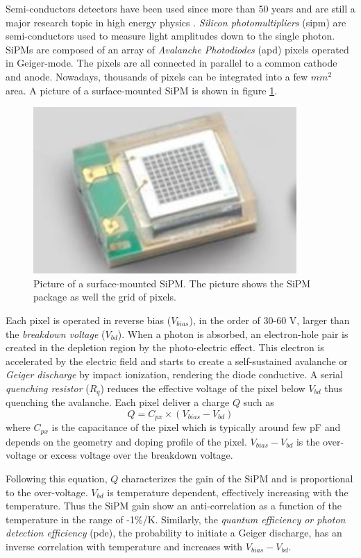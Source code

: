 Semi-conductors detectors have been used since more than 50 years and are still a major research topic in high energy physics \cite{1748-0221-4-04-P04004, Garutti:2011qv, Garutti:2017ipx}. \textit{Silicon photomultipliers} (\acrshort{sipm}) are semi-conductors used to measure light amplitudes down to the single photon. SiPMs are composed of an array of \textit{Avalanche Photodiodes} (\acrshort{apd}) pixels operated in Geiger-mode. The pixels are all connected in parallel to a common cathode and anode. Nowadays, thousands of pixels can be integrated into a few $mm^2$ area. A picture of a surface-mounted SiPM is shown in figure \ref{fig:SMD_SiPM}.

\begin{figure}[htbp!]
  \centering
  \includegraphics[width=0.4\linewidth]{chap3/fig/SMD_SiPM.png}
  \caption{Picture of a surface-mounted SiPM. The picture shows the SiPM package as well the grid of pixels.} \label{fig:SMD_SiPM}
\end{figure}

Each pixel is operated in reverse bias ($V_{bias}$), in the order of 30-60 V, larger than the \textit{breakdown voltage} ($V_{bd}$). When a photon is absorbed, an electron-hole pair is created in the depletion region by the photo-electric effect. This electron is accelerated by the electric field and starts to create a self-sustained avalanche or \textit{Geiger discharge} by impact ionization, rendering the diode conductive. A serial \textit{quenching resistor} ($R_q$) reduces the effective voltage of the pixel below $V_{bd}$ thus quenching the avalanche. Each pixel deliver a charge $Q$ such as
\begin{equation}
  Q = C_{px} \times (V_{bias} - V_{bd})
\end{equation}
where $C_{px}$ is the capacitance of the pixel which is typically around few pF and depends on the geometry and doping profile of the pixel. $V_{bias} - V_{bd}$ is the over-voltage or excess voltage over the breakdown voltage.

Following this equation, $Q$ characterizes the gain of the SiPM and is proportional to the over-voltage. $V_{bd}$ is temperature dependent, effectively increasing with the temperature. Thus the SiPM gain show an anti-correlation as a function of the temperature in the range of -1\%/K. Similarly, the \textit{quantum efficiency or photon detection efficiency} (\acrshort{pde}), the probability to initiate a Geiger discharge, has an inverse correlation with temperature and increases with $V_{bias} - V_{bd}$.

